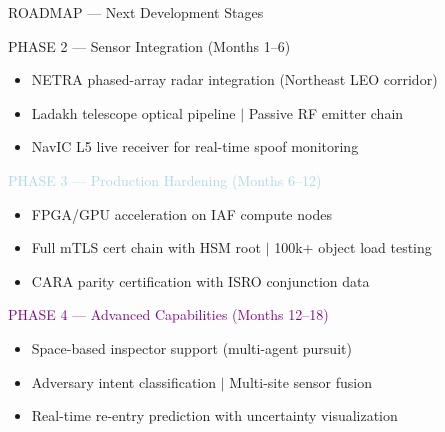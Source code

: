 \documentclass[aspectratio=169,11pt]{beamer}
\begin{document}
\begin{frame}{ROADMAP — Next Development Stages}
\begin{block}{\textcolor{saffron}{PHASE 2 — Sensor Integration (Months 1--6)}}
\small
\begin{itemize}
  \item NETRA phased-array radar integration (Northeast LEO corridor)
  \item Ladakh telescope optical pipeline \(\vert\) Passive RF emitter chain
  \item NavIC L5 live receiver for real-time spoof monitoring
\end{itemize}
\end{block}

\begin{block}{\textcolor{lightblue}{PHASE 3 — Production Hardening (Months 6--12)}}
\small
\begin{itemize}
  \item FPGA/GPU acceleration on IAF compute nodes
  \item Full mTLS cert chain with HSM root \(\vert\) 100k+ object load testing
  \item CARA parity certification with ISRO conjunction data
\end{itemize}
\end{block}

\begin{block}{\textcolor{purple}{PHASE 4 — Advanced Capabilities (Months 12--18)}}
\small
\begin{itemize}
  \item Space-based inspector support (multi-agent pursuit)
  \item Adversary intent classification \(\vert\) Multi-site sensor fusion
  \item Real-time re-entry prediction with uncertainty visualization
\end{itemize}
\end{block}
\end{frame}
\end{document}
